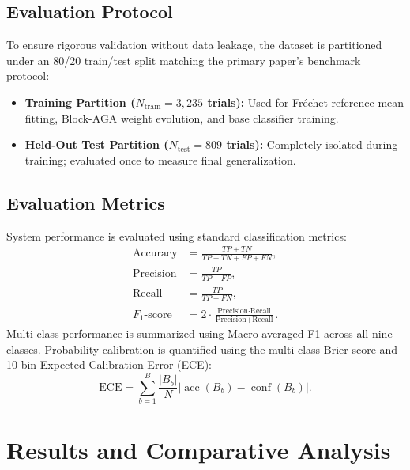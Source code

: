 \documentclass[10pt,twocolumn,a4paper]{article}
\begin{document}
\subsection{Evaluation Protocol}
To ensure rigorous validation without data leakage, the dataset is partitioned under an 80/20 train/test split matching the primary paper's benchmark protocol:
\begin{itemize}
    \item \textbf{Training Partition ($N_{\text{train}} = 3,235$ trials):} Used for Fr\'echet reference mean fitting, Block-AGA weight evolution, and base classifier training.
    \item \textbf{Held-Out Test Partition ($N_{\text{test}} = 809$ trials):} Completely isolated during training; evaluated once to measure final generalization.
\end{itemize}

\subsection{Evaluation Metrics}
System performance is evaluated using standard classification metrics:
\begin{align}
\text{Accuracy} &= \frac{TP + TN}{TP + TN + FP + FN}, \label{eq:acc} \\
\text{Precision} &= \frac{TP}{TP + FP}, \label{eq:prec} \\
\text{Recall} &= \frac{TP}{TP + FN}, \label{eq:rec} \\
F_1\text{-score} &= 2 \cdot \frac{\text{Precision} \cdot \text{Recall}}{\text{Precision} + \text{Recall}}. \label{eq:f1}
\end{align}
Multi-class performance is summarized using Macro-averaged F1 across all nine classes. Probability calibration is quantified using the multi-class Brier score and 10-bin Expected Calibration Error (ECE):
\begin{equation}
\text{ECE} = \sum_{b=1}^{B} \frac{|B_b|}{N} \left| \operatorname{acc}(B_b) - \operatorname{conf}(B_b) \right|.
\label{eq:ece}
\end{equation}

\section{Results and Comparative Analysis}
\end{document}
